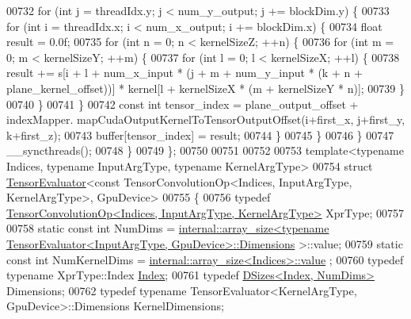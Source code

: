 \begin{DoxyCode}
00732       \textcolor{keywordflow}{for} (\textcolor{keywordtype}{int} j = threadIdx.y; j < num\_y\_output; j += blockDim.y) \{
00733         \textcolor{keywordflow}{for} (\textcolor{keywordtype}{int} i = threadIdx.x; i < num\_x\_output; i += blockDim.x) \{
00734           \textcolor{keywordtype}{float} result = 0.0f;
00735           \textcolor{keywordflow}{for} (\textcolor{keywordtype}{int} n = 0; n < kernelSizeZ; ++n) \{
00736             \textcolor{keywordflow}{for} (\textcolor{keywordtype}{int} m = 0; m < kernelSizeY; ++m) \{
00737               \textcolor{keywordflow}{for} (\textcolor{keywordtype}{int} l = 0; l < kernelSizeX; ++l) \{
00738                 result += s[i + l + num\_x\_input * (j + m + num\_y\_input * (k + n + plane\_kernel\_offset))] * 
      kernel[l + kernelSizeX * (m + kernelSizeY * n)];
00739               \}
00740             \}
00741           \}
00742           \textcolor{keyword}{const} \textcolor{keywordtype}{int} tensor\_index = plane\_output\_offset + indexMapper.
      mapCudaOutputKernelToTensorOutputOffset(i+first\_x, j+first\_y, k+first\_z);
00743           buffer[tensor\_index] = result;
00744         \}
00745       \}
00746     \}
00747     \_\_syncthreads();
00748   \}
00749 \};
00750 
00751 
00752 
00753 \textcolor{keyword}{template}<\textcolor{keyword}{typename} Indices, \textcolor{keyword}{typename} InputArgType, \textcolor{keyword}{typename} KernelArgType>
00754 \textcolor{keyword}{struct }\hyperlink{struct_eigen_1_1_tensor_evaluator}{TensorEvaluator}<const TensorConvolutionOp<Indices, InputArgType, KernelArgType>, 
      GpuDevice>
00755 \{
00756   \textcolor{keyword}{typedef} \hyperlink{class_eigen_1_1_tensor_convolution_op}{TensorConvolutionOp<Indices, InputArgType, KernelArgType>}
       XprType;
00757 
00758   \textcolor{keyword}{static} \textcolor{keyword}{const} \textcolor{keywordtype}{int} NumDims =  
      \hyperlink{struct_eigen_1_1internal_1_1array__size}{internal::array\_size<typename TensorEvaluator<InputArgType, GpuDevice>::Dimensions}
      >::value;
00759   \textcolor{keyword}{static} \textcolor{keyword}{const} \textcolor{keywordtype}{int} NumKernelDims = \hyperlink{struct_eigen_1_1internal_1_1array__size}{internal::array\_size<Indices>::value}
      ;
00760   \textcolor{keyword}{typedef} \textcolor{keyword}{typename} XprType::Index \hyperlink{namespace_eigen_a62e77e0933482dafde8fe197d9a2cfde}{Index};
00761   \textcolor{keyword}{typedef} \hyperlink{struct_eigen_1_1_d_sizes}{DSizes<Index, NumDims>} Dimensions;
00762   \textcolor{keyword}{typedef} \textcolor{keyword}{typename} TensorEvaluator<KernelArgType, GpuDevice>::Dimensions KernelDimensions;

\end{DoxyCode}
